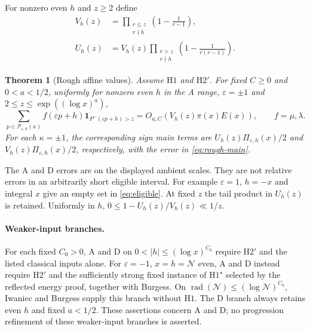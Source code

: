 \documentclass[11pt]{article}
\newtheorem{theoremD}{Theorem}
\theoremstyle{definition}
\newcommand{\ind}{\mathbf 1}
\DeclareMathOperator{\rad}{rad}
\newcommand{\GN}{\mathcal N}
\theoremstyle{remark}
\numberwithin{equation}{section}
\begin{document}
For nonzero even $h$ and $z\ge2$ define
\begin{equation}\label{eq:rough-factors}
 \begin{split}
 V_h(z)&=\prod_{\substack{r\le z\\r\nmid h}}
                       \left(1-\frac1{r-1}\right),\\
 U_h(z)&=V_h(z)\prod_{\substack{r>z\\r\nmid h}}
                       \left(1-\frac1{r(r-1)}\right).
 \end{split}
\end{equation}
\begin{theoremD}[Rough affine values]\label{thm:rough}
Assume $\mathrm H1$ and $\mathrm H2'$. For fixed $C\ge0$ and
$0<a<1/2$, uniformly for nonzero even $h$ in the A range,
$\varepsilon=\pm1$ and $2\le z\le\exp((\log x)^a)$,
\begin{equation}\label{eq:rough-main}
 \sum_{p\in\mathcal P_{\varepsilon,h}(x)}
 f(\varepsilon p+h)\ind_{P^-(\varepsilon p+h)>z}
 =O_{a,C}(V_h(z)\pi(x)E(x)),\qquad f=\mu,\lambda.
\end{equation}
For each $\kappa=\pm1$, the corresponding sign main terms are
$U_h(z)\Pi_{\varepsilon,h}(x)/2$ and
$V_h(z)\Pi_{\varepsilon,h}(x)/2$, respectively, with the error in
\eqref{eq:rough-main}.
\end{theoremD}

The A and D errors are on the displayed ambient scales. They are
not relative errors in an arbitrarily short eligible interval.
For example $\varepsilon=1$, $h=-x$ and integral $x$ give an empty
set in \eqref{eq:eligible}. At fixed $z$ the tail product in $U_h(z)$
is retained. Uniformly in $h$,
$0\le1-U_h(z)/V_h(z)\ll1/z$.

\paragraph{Weaker-input branches.}
For each fixed $C_0>0$, A and D on $0<|h|\le(\log x)^{C_0}$
require $\mathrm H2'$ and the listed classical inputs alone.
For $\varepsilon=-1$, $x=h=\GN$ even, A and D instead require
$\mathrm H2'$ and the sufficiently strong fixed instance of
$\mathrm H1^\star$ selected by the reflected energy proof, together
with Burgess. On $\rad(\GN)\le(\log\GN)^{C_0}$, Iwaniec and
Burgess supply this branch without $\mathrm H1$.
The D branch always retains even $h$ and fixed $a<1/2$.
These assertions concern A and D; no progression refinement of
these weaker-input branches is asserted.
\end{document}
